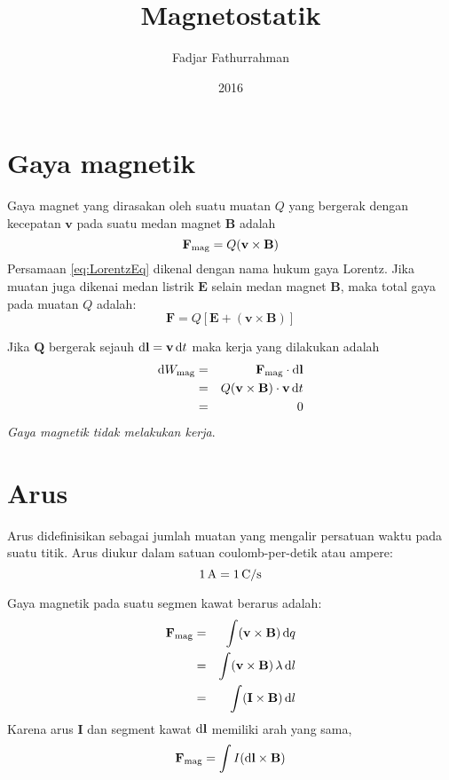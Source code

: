 \documentclass[10pt,english,twocolumn]{extarticle}
\newcommand{\dd}{\textnormal{d}}
\begin{document}
\title{Magnetostatik}
\author{Fadjar Fathurrahman}
\date{2016}
\maketitle

\section{Gaya magnetik}

Gaya magnet yang dirasakan oleh suatu muatan $Q$ yang bergerak dengan kecepatan $\mathbf{v}$
pada suatu medan magnet $\mathbf{B}$ adalah
\begin{equation}\label{eq:LorentzEq}
\mathbf{F}_{\textnormal{mag}} = Q(\mathbf{v}\times\mathbf{B})
\end{equation}
Persamaan \ref{eq:LorentzEq} dikenal dengan nama hukum gaya Lorentz.
Jika muatan juga dikenai medan listrik $\mathbf{E}$ selain medan magnet $\mathbf{B}$,
maka total gaya pada muatan $Q$ adalah:
\begin{equation}
\mathbf{F} = Q\left[ \mathbf{E} + (\mathbf{v}\times\mathbf{B}) \right]
\end{equation}

Jika $\mathbf{Q}$ bergerak sejauh $\dd \mathbf{l} = \mathbf{v}\, \dd t$ maka kerja yang
dilakukan adalah
\begin{eqnarray*}
\dd W_{\textnormal{mag}} & = & \mathbf{F}_{\textnormal{mag}} \cdot \dd \mathbf{l} \\
 & = & Q (\mathbf{v} \times \mathbf{B}) \cdot \mathbf{v}\, \dd t \\
 & = & 0
\end{eqnarray*}
\textit{Gaya magnetik tidak melakukan kerja}.

\section{Arus}

Arus didefinisikan sebagai jumlah muatan yang mengalir persatuan waktu pada
suatu titik. Arus diukur dalam satuan coulomb-per-detik atau ampere:
\begin{equation}
1\,\textnormal{A} = 1\,\textnormal{C/s}
\end{equation}

Gaya magnetik pada suatu segmen kawat berarus adalah:
\begin{eqnarray*}
\mathbf{F}_{\textnormal{mag}} & = & \int (\mathbf{v} \times \mathbf{B})\,\dd q \\
& = & \int (\mathbf{v} \times \mathbf{B})\, \lambda\, \dd l \\
& = & \int (\mathbf{I} \times \mathbf{B})\,\dd l
\end{eqnarray*}
Karena arus $\mathbf{I}$ dan segment kawat $\dd\mathbf{l}$ memiliki arah yang sama,
\begin{equation}
\mathbf{F}_{\textnormal{mag}} = \int I (\dd \mathbf{l} \times \mathbf{B})
\end{equation}
\end{document}
